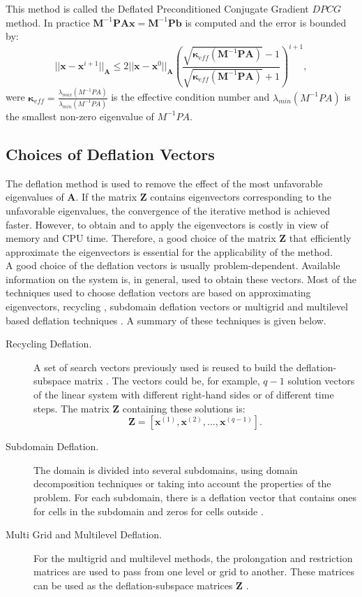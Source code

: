 \documentclass[12pt]{article}
\begin{document}
This method is called the Deflated Preconditioned Conjugate Gradient $DPCG$ method.
In practice $\mathbf{M}^{-1}\mathbf{P}\mathbf{A}\mathbf{x}=\mathbf{M}^{-1}\mathbf{P}\mathbf{b}$ is computed and the error is bounded by:
\begin{equation*}
 ||\mathbf{x}-\mathbf{x}^{i+1}||_\mathbf{A}\leq 2||\mathbf{x}-\mathbf{x}^{0}||_\mathbf{A} \left( \frac{\sqrt{\mathbf{\kappa}_{eff}(\mathbf{M}^{-1}\mathbf{P}\mathbf{A})}-1}{\sqrt{\mathbf{\kappa}_{eff}(\mathbf{M}^{-1}\mathbf{P}\mathbf{A})}+1} \right)^{i+1},
\end{equation*}
were $\mathbf{\kappa}_{eff}=\frac{\lambda_{max}(M^{-1}PA)}{\lambda_{min}(M^{-1}PA)}$ is the effective condition 
number and $\lambda_{min}(M^{-1}PA)$ is the smallest non-zero eigenvalue of $M^{-1}PA$.

\subsection{Choices of Deflation Vectors}
\hspace{0.5cm}The deflation method is used to remove the effect of the most unfavorable eigenvalues
of $\mathbf{A}$. If the matrix $\mathbf{Z}$ contains eigenvectors corresponding to the unfavorable 
eigenvalues, the convergence of the 
iterative method is achieved faster. However, to obtain and to apply the eigenvectors is costly in view of memory and CPU time.
Therefore, a good choice of the matrix $\mathbf{Z}$ that efficiently approximate the eigenvectors is essential
for the applicability of the method.\\
A good choice of the deflation vectors is usually problem-dependent. Available information on the system is, in general,
used to obtain these vectors.
Most of the techniques used to choose deflation vectors are based on approximating eigenvectors, 
recycling \cite{Clemens04}, subdomain deflation vectors \cite{Vuik02} or multigrid and 
multilevel based deflation techniques \cite{Tang09,Smith96}. A summary of these techniques is given below.
\begin{description}
 \item [Recycling Deflation.] A set of search vectors previously used is reused to build the deflation-subspace 
 matrix \cite{Clemens04}. 
The vectors could be, for example, $q-1$
solution vectors of the linear system with different right-hand sides or of different time steps.
The matrix $\mathbf{Z}$ containing these solutions is:
$$\mathbf{Z}=[\mathbf{x}^{(1)},\mathbf{x}^{(2)},...,\mathbf{x}^{(q-1)}].$$
 \item [Subdomain Deflation.] The domain is divided into several subdomains,
 using domain decomposition techniques or taking into account the properties of the problem.
For each subdomain, there is a deflation vector that contains ones for cells in the 
subdomain and zeros for cells outside \cite{Vuik02}.
 \item [Multi Grid and Multilevel Deflation.] For the multigrid and multilevel methods, 
 the prolongation and restriction matrices are used to pass from one level or grid to another. 
These matrices can be used as the deflation-subspace matrices $\mathbf{Z}$ \cite{Tang09}.
\end{description}
\newpage
\end{document}
